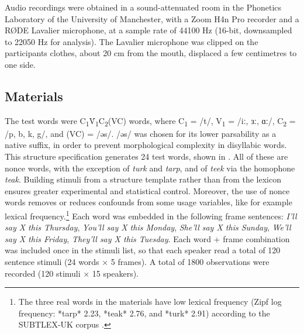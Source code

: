 \documentclass[
  12pt,
  a4paper,
]{article}
\begin{document}
Audio recordings were obtained in a sound-attenuated room in the
Phonetics Laboratory of the University of Manchester, with a Zoom H4n
Pro recorder and a RØDE Lavalier microphone, at a sample rate of 44100
Hz (16-bit, downsampled to 22050 Hz for analysis). The Lavalier
microphone was clipped on the participants clothes, about 20 cm from the
mouth, displaced a few centimetres to one side.

\hypertarget{materials}{%
\subsection{Materials}\label{materials}}


The test words were
C\textsubscript{1}V́\textsubscript{1}C\textsubscript{2}(VC) words, where
C\textsubscript{1} = /t/, V\textsubscript{1} = /iː, ɜː, ɑː/,
C\textsubscript{2} = /p, b, k, g/, and (VC) = /əs/. /əs/ was chosen for
its lower parsability as a native suffix, in order to prevent
morphological complexity in disyllabic words. This structure
specification generates 24 test words, shown in . All of
these are nonce words, with the exception of \emph{turk} and
\emph{tarp}, and of \emph{teek} via the homophone \emph{teak}. Building
stimuli from a structure template rather than from the lexicon ensures
greater experimental and statistical control. Moreover, the use of nonce
words removes or reduces confounds from some usage variables, like for
example lexical
frequency.\footnote{The three real words in the materials have low lexical frequency (Zipf log frequency: *tarp* 2.23, *teak* 2.76, and *turk* 2.91) according to the SUBTLEX-UK corpus \citep{van-heuven2014}.}
Each word was embedded in the following frame sentences: \emph{I'll say
X this Thursday}, \emph{You'll say X this Monday}, \emph{She'll say X
this Sunday}, \emph{We'll say X this Friday}, \emph{They'll say X this
Tuesday}. Each word + frame combination was included once in the stimuli
list, so that each speaker read a total of 120 sentence stimuli (24
words × 5 frames). A total of 1800 observations were recorded (120
stimuli × 15 speakers).
\end{document}
